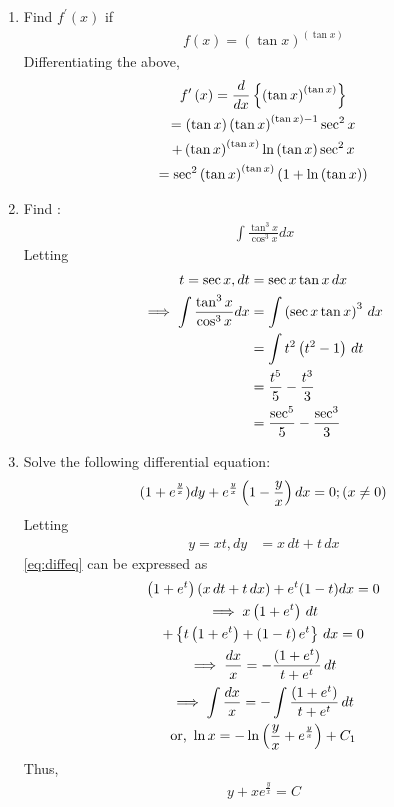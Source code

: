 \documentclass[journal,12pt,twocolumn]{IEEEtran}
\renewcommand\thesection{\arabic{section}}
\begin{document}
\begin{enumerate}[label=\thesection.\arabic*.,ref=\thesection.\theenumi]
\item Find $f^{\prime}\left(x\right)$ if 
	\begin{align} 
	f\left(x\right)=\left(\tan x\right)^{\left(\tan x\right)} 
	\end{align}
	\solution Differentiating the above, 
	\begin{multline} 
		f^{\prime}\left(x\right)=\frac{d}{dx}\left\{\left(\tan x\right)^{\left(\tan x\right)} \right\}
		\\
		=\left(\tan x\right)\left(\tan x\right)^{\left(\tan x\right)-1}\sec^2 x
		\\
		+ \left(\tan x\right)^{\left(\tan x\right)} \ln \left(\tan x\right)\sec^2 x
		\\
		= \sec^2\left(\tan x\right)^{\left(\tan x\right)}\left(1 +\ln \left(\tan x\right) \right)
	\end{multline}

\item Find :
	\begin{align}
		\int \frac{\tan^3x}{\cos^3x} dx 
	\end{align} 
\solution Letting 
	\begin{align}
		t = \sec x, dt &= \sec x \tan x \, dx
		\\
\implies 		\int \frac{\tan^3x}{\cos^3x} dx &= 
		\int \left(\sec x \tan x\right)^3 \, dx
		\\
		&= \int t^2\left(t^2-1\right)\, dt
		\\
		&= \frac{t^5}{5} - \frac{t^3}{3}
		\\
		&= \frac{\sec^5}{5} - \frac{\sec^3}{3}
	\end{align} 



\item Solve the following differential equation:
	\begin{align}
		\label{eq:diffeq}
		(1+e^{\frac{y}{x}}) dy+e^{\frac{y}{x}}\left(1-\frac{y}{x}\right) dx = 0 ; (x \ne 0) 
	\end{align}
\solution  Letting
	\begin{align}
		y = xt, dy &= x\,dt + t\, dx
	\end{align}
		\eqref{eq:diffeq}
 can be expressed as
	\begin{multline}
		\left(1+e^{t}\right)\left(x\,dt + t\, dx\right) +e^{t}(1-t) dx = 0 
		\\
		\implies x\left(1+e^{t}\right)\,dt 
		\\
		+ \left\{t\left(1+e^{t}\right)+\left(1-t\right)e^t \right\}\,dx = 0
		\\
		\implies \frac{dx}{x} = - \frac{\left(1+e^{t}\right)}{t+e^t}\,dt 
		\\
		\implies 
		\int\frac{dx}{x} = - \int\frac{\left(1+e^{t}\right)}{t+e^t}\,dt 
		\\
		\text{or, }\ln x = -\ln \left(\frac{y}{x}+e^{\frac{y}{x}}\right)+C_1
	\end{multline}
	Thus, 
	\begin{align}
y+xe^{\frac{y}{x}} = C
	\end{align}

\end{enumerate}
\end{document}
